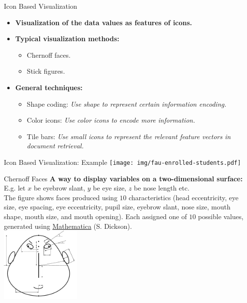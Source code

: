 \begin{frame}{Icon Based Visualization}
  \centering
  \begin{itemize}
  \item \textbf{Visualization of the data values as features of icons.}
  \item \textbf{Typical visualization methods:}
    \begin{itemize}
    \item Chernoff faces.
    \item Stick figures.
    \end{itemize}
  \item \textbf{General techniques:}
    \begin{itemize}
    \item Shape coding: \emph{Use shape to represent certain information encoding.}
    \item Color icons: \emph{Use color icons to encode more information.}
    \item Tile bars: \emph{Use small icons to represent the relevant feature vectors in document retrieval.}
    \end{itemize}
  \end{itemize}
\end{frame}


\begin{frame}{Icon Based Visualization: Example}
  \centering
  \texttt{[image: img/fau-enrolled-students.pdf]}
\end{frame}

\begin{frame}{Chernoff Faces}
  \textbf{A way to display variables on a two-dimensional surface:}\\
  E.g. let $x$ be eyebrow slant, $y$ be eye size, $z$ be nose length etc.\\
  The figure shows faces produced using $10$ characteristics (head eccentricity, eye size, eye spacing, eye eccentricity, pupil size, eyebrow slant, nose size, mouth shape, mouth size, and mouth opening). Each assigned one of $10$ possible values, generated using \href{https://www.wolfram.com/mathematica/}{Mathematica} (S. Dickson).\\[0.5cm]
  \centering
  \includegraphics[width=4cm]{img/chernoff_faces_construction.pdf}
\end{frame}

